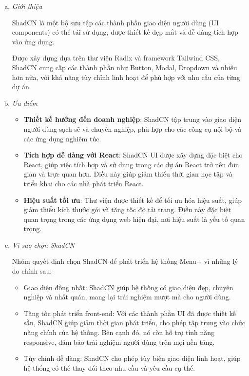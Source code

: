 \begin{enumerate}[(a)]
	\item \textit{Giới thiệu}

	      ShadCN là một bộ sưu tập các thành phần giao diện người dùng (UI components) có thể tái sử dụng, được thiết kế đẹp mắt và dễ dàng tích hợp vào ứng dụng.

	      Được xây dựng dựa trên thư viện Radix và framework Tailwind CSS, ShadCN cung cấp các thành phần như Button, Modal, Dropdown và nhiều hơn nữa, với khả năng tùy chỉnh linh hoạt để phù hợp với nhu cầu của từng dự án.

	\item \textit{Ưu điểm}

	      \begin{itemize}
		      \item \textbf{Thiết kế hướng đến doanh nghiệp}: ShadCN tập trung vào giao diện người dùng sạch sẽ và chuyên nghiệp, phù hợp cho các công cụ nội bộ và các ứng dụng nghiêm túc.
		      \item \textbf{Tích hợp dễ dàng với React}: ShadCN UI được xây dựng đặc biệt cho React, giúp việc tích hợp và sử dụng trong các dự án React trở nên đơn giản và trực quan hơn. Điều này giúp giảm thiểu thời gian học tập và triển khai cho các nhà phát triển React.
		      \item \textbf{Hiệu suất tối ưu}: Thư viện được thiết kế để tối ưu hóa hiệu suất, giúp giảm thiểu kích thước gói và tăng tốc độ tải trang. Điều này đặc biệt quan trọng trong các ứng dụng web hiện đại, nơi hiệu suất là yếu tố quan trọng.
	      \end{itemize}

	\item \textit{Vì sao chọn ShadCN}

	      Nhóm quyết định chọn ShadCN để phát triển hệ thống Menu+ vì những lý do chính sau:

	      \begin{itemize}
		      \item Giao diện đồng nhất: ShadCN giúp hệ thống có giao diện đẹp, chuyên nghiệp và nhất quán, mang lại trải nghiệm mượt mà cho người dùng.
		      \item Tăng tốc phát triển front-end: Với các thành phần UI đã được thiết kế sẵn, ShadCN giúp giảm thời gian phát triển, cho phép tập trung vào chức năng chính của hệ thống. Bên cạnh đó, nó còn hỗ trợ tính năng responsive, đảm bảo trải nghiệm người dùng trên mọi nền tảng.
		      \item Tùy chỉnh dễ dàng: ShadCN cho phép tùy biến giao diện linh hoạt, giúp hệ thống có thể thay đổi theo nhu cầu và yêu cầu cụ thể.
	      \end{itemize}


\end{enumerate}
